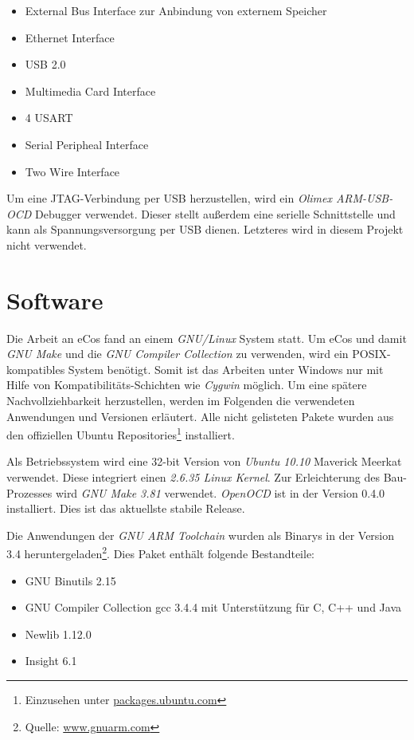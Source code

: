 \documentclass[
  a4paper,					%
  twoside,
  DIV=calc,     				%
  bibliography=totoc,
  cleardoublepage=empty,
  ngerman,     					%
  final       					%
]{scrbook}
\begin{document}
\begin{itemize}
	\item External Bus Interface zur Anbindung von externem Speicher
	\item Ethernet Interface
	\item USB 2.0
	\item Multimedia Card Interface
	\item 4 USART
	\item Serial Peripheal Interface
	\item Two Wire Interface
\end{itemize}

Um eine JTAG-Verbindung per USB herzustellen, wird ein \emph{Olimex ARM-USB-OCD} Debugger verwendet. Dieser stellt außerdem eine serielle Schnittstelle und kann als Spannungsversorgung per USB dienen. Letzteres wird in diesem Projekt nicht verwendet.





\section{Software}
\label{sec:Software}
Die Arbeit an eCos fand an einem \emph{GNU/Linux} System statt. Um eCos und damit \emph{GNU Make} und die \emph{GNU Compiler Collection} zu verwenden, wird ein POSIX-kompatibles System benötigt. Somit ist das Arbeiten unter Windows nur mit Hilfe von Kompatibilitäts-Schichten wie \emph{Cygwin} möglich. Um eine spätere Nachvollziehbarkeit herzustellen, werden im Folgenden die verwendeten Anwendungen und Versionen erläutert. Alle nicht gelisteten Pakete wurden aus den offiziellen Ubuntu Repositories\footnote{Einzusehen unter \url{packages.ubuntu.com}} installiert.

Als Betriebssystem wird eine 32-bit Version von \emph{Ubuntu 10.10} Maverick Meerkat verwendet. Diese integriert einen \emph{2.6.35 Linux Kernel}. Zur Erleichterung des Bau-Prozesses wird \emph{GNU Make 3.81} verwendet. \emph{OpenOCD} ist in der Version 0.4.0 installiert. Dies ist das aktuellste stabile Release.

Die Anwendungen der \emph{GNU ARM Toolchain} wurden als Binarys in der Version 3.4 heruntergeladen\footnote{Quelle: \url{www.gnuarm.com}}. Dies Paket enthält folgende Bestandteile:
\begin{itemize}
	\item GNU Binutils 2.15
	\item GNU Compiler Collection gcc 3.4.4 mit Unterstützung für C, C++ und Java
	\item Newlib 1.12.0
	\item Insight 6.1
\end{itemize}
\end{document}
